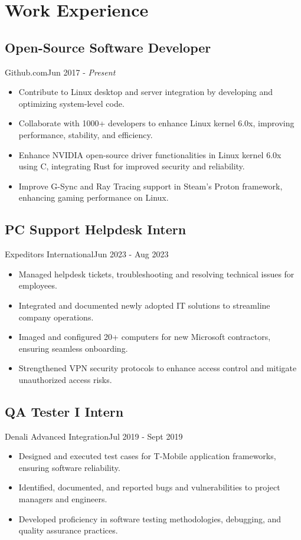 \section{Work Experience}

\subsection{Open-Source Software Developer}{Github.com}{Jun 2017 - \textit{Present}}
\begin{itemize}
    \item Contribute to Linux desktop and server integration by developing and optimizing system-level code.
    \item Collaborate with 1000+ developers to enhance Linux kernel 6.0x, improving performance, stability, and efficiency.
    \item Enhance NVIDIA open-source driver functionalities in Linux kernel 6.0x using C, integrating Rust for improved security and reliability.
    \item Improve G-Sync and Ray Tracing support in Steam’s Proton framework, enhancing gaming performance on Linux.
\end{itemize}

\subsection{PC Support Helpdesk Intern}{Expeditors International}{Jun 2023 - Aug 2023}
\begin{itemize}
    \item Managed helpdesk tickets, troubleshooting and resolving technical issues for employees.
    \item Integrated and documented newly adopted IT solutions to streamline company operations.
    \item Imaged and configured 20+ computers for new Microsoft contractors, ensuring seamless onboarding.
    \item Strengthened VPN security protocols to enhance access control and mitigate unauthorized access risks.
\end{itemize}

\subsection{QA Tester I Intern}{Denali Advanced Integration}{Jul 2019 - Sept 2019}
\begin{itemize}
    \item Designed and executed test cases for T-Mobile application frameworks, ensuring software reliability.
    \item Identified, documented, and reported bugs and vulnerabilities to project managers and engineers.
    \item Developed proficiency in software testing methodologies, debugging, and quality assurance practices.
\end{itemize}
